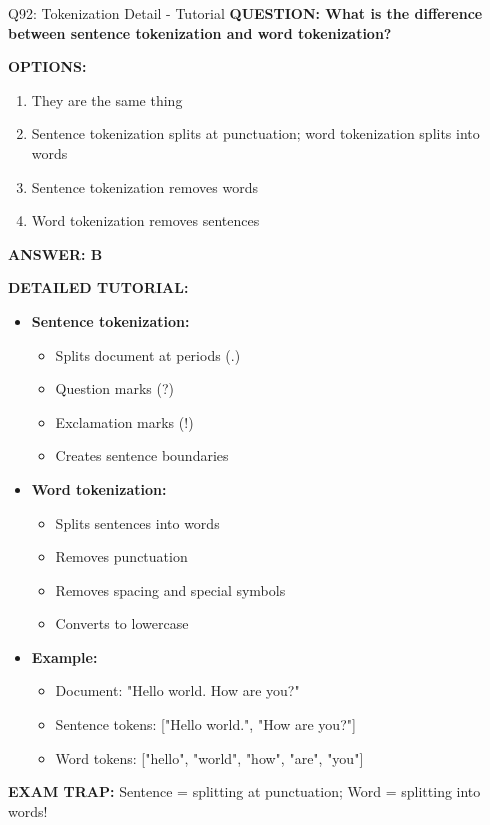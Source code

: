 \documentclass[8pt]{beamer}
\begin{document}
	\begin{frame}{Q92: Tokenization Detail - Tutorial}
		\fontsize{6.5}{7.5}\selectfont
		\textbf{QUESTION: What is the difference between sentence tokenization and word tokenization?}
		
		\vspace{0.1cm}
		\textbf{OPTIONS:}
		\begin{enumerate}
			\item They are the same thing
			\item Sentence tokenization splits at punctuation; word tokenization splits into words
			\item Sentence tokenization removes words
			\item Word tokenization removes sentences
		\end{enumerate}
		
		\vspace{0.1cm}
		\textcolor{myblue}{\textbf{ANSWER: B}}
		
		\vspace{0.1cm}
		\textbf{DETAILED TUTORIAL:}
		\begin{itemize}
			\item \textbf{Sentence tokenization:}
			\begin{itemize}
				\item Splits document at periods (.)
				\item Question marks (?)
				\item Exclamation marks (!)
				\item Creates sentence boundaries
			\end{itemize}
			\item \textbf{Word tokenization:}
			\begin{itemize}
				\item Splits sentences into words
				\item Removes punctuation
				\item Removes spacing and special symbols
				\item Converts to lowercase
			\end{itemize}
			\item \textbf{Example:}
			\begin{itemize}
				\item Document: "Hello world. How are you?"
				\item Sentence tokens: ["Hello world.", "How are you?"]
				\item Word tokens: ["hello", "world", "how", "are", "you"]
			\end{itemize}
		\end{itemize}
		
		\textcolor{myred}{\textbf{EXAM TRAP:}} Sentence = \textcolor{myblue}{splitting at punctuation}; Word = \textcolor{myblue}{splitting into words}!
	\end{frame}
	
\end{document}
